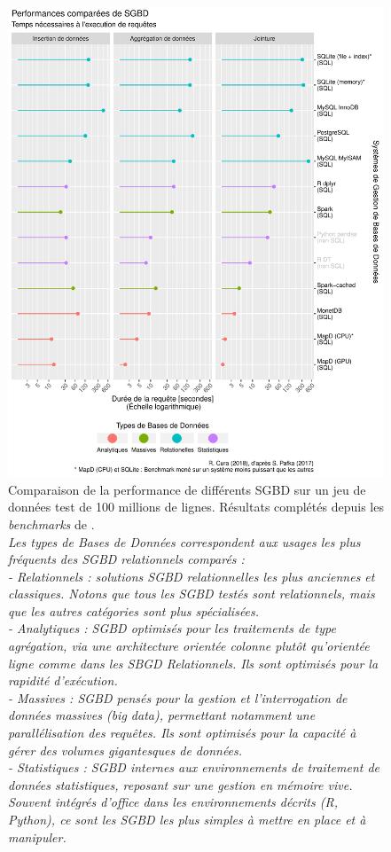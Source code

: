 \clearpage
\begin{figure}[H]
	\centering
	\includegraphics[width=.95\linewidth]{img/benchmark_results.pdf}
	\captionsetup{width=.95\linewidth}
	\caption[Comparaison de la performance de différents SGBD sur un jeu de données test de 100 millions de lignes.]{Comparaison de la performance de différents SGBD sur un jeu de données test de 100 millions de lignes. Résultats complétés depuis les \textit{benchmarks} de \textcite{pafka_benchm-databases_2017}.\\
		\textit{
			Les \og types de Bases de Données\fg{} correspondent aux usages les plus fréquents des SGBD relationnels comparés :\\
			- Relationnels : solutions SGBD relationnelles les plus anciennes et classiques. Notons que tous les SGBD testés sont relationnels, mais que les autres catégories sont plus spécialisées.\\
			- Analytiques : SGBD optimisés pour les traitements de type agrégation, via une architecture orientée colonne plutôt qu'orientée ligne comme dans les SBGD Relationnels. Ils sont optimisés pour la rapidité d'exécution.\\
			- Massives : SGBD pensés pour la gestion et l'interrogation de données massives (big data), permettant notamment une parallélisation des requêtes. Ils sont optimisés pour la capacité à gérer des volumes gigantesques de données.\\
			- Statistiques : SGBD internes aux environnements de traitement de données statistiques, reposant sur une gestion en mémoire vive.
			Souvent intégrés d'office dans les environnements décrits (R, Python), ce sont les SGBD les plus simples à mettre en place et à manipuler.}
	}
	\label{fig:db-benchmarks}
\end{figure}
\clearpage

